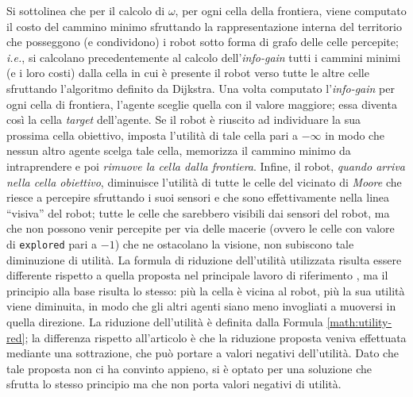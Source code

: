 Si sottolinea che per il calcolo di $\omega$, per ogni cella della frontiera, viene computato il costo del cammino minimo sfruttando la rappresentazione interna del territorio che posseggono (e condividono) i robot sotto forma di grafo delle celle percepite; \textit{i.e.}, si calcolano precedentemente al calcolo dell'\textit{info-gain} tutti i cammini minimi (e i loro costi) dalla cella in cui è presente il robot verso tutte le altre celle sfruttando l'algoritmo definito da Dijkstra.
Una volta computato l'\textit{info-gain} per ogni cella di frontiera, l'agente sceglie quella con il valore maggiore; essa diventa così la cella \textit{target} dell'agente.
Se il robot è riuscito ad individuare la sua prossima cella obiettivo, imposta l'utilità di tale cella pari a $-\infty$ in modo che nessun altro agente scelga tale cella, memorizza il cammino minimo da intraprendere e poi \textit{rimuove la cella dalla frontiera}.
Infine, il robot, \textit{quando arriva nella cella obiettivo}, diminuisce l'utilità di tutte le celle del vicinato di \textit{Moore} che riesce a percepire sfruttando i suoi sensori e che sono effettivamente nella linea “visiva” del robot; tutte le celle che sarebbero visibili dai sensori del robot, ma che non possono venir percepite per via delle macerie (ovvero le celle con valore di \texttt{explored} pari a $-1$) che ne ostacolano la visione, non subiscono tale diminuzione di utilità.
La formula di riduzione dell'utilità utilizzata risulta essere differente rispetto a quella proposta nel principale lavoro di riferimento \cite{burgard2005}, ma il principio alla base risulta lo stesso: più la cella è vicina al robot, più la sua utilità viene diminuita, in modo che gli altri agenti siano meno invogliati a muoversi in quella direzione.
La riduzione dell'utilità è definita dalla Formula \ref{math:utility-red}; la differenza rispetto all'articolo è che la riduzione proposta veniva effettuata mediante una sottrazione, che può portare a valori negativi dell'utilità. Dato che tale proposta non ci ha convinto appieno, si è optato per una soluzione che sfrutta lo stesso principio ma che non porta valori negativi di utilità. 
